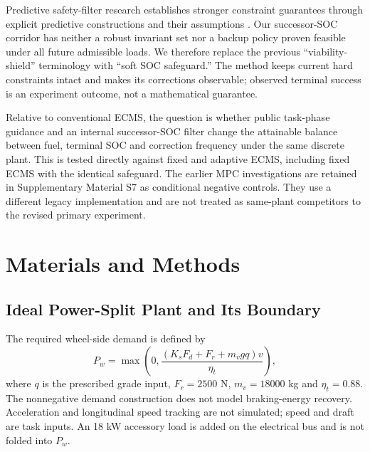\documentclass[energies,article,submit,moreauthors]{Definitions/mdpi}
\begin{document}
Predictive safety-filter research establishes stronger constraint guarantees through explicit predictive constructions and their assumptions \cite{wabersich2021}. Our successor-SOC corridor has neither a robust invariant set nor a backup policy proven feasible under all future admissible loads. We therefore replace the previous ``viability-shield'' terminology with ``soft SOC safeguard.'' The method keeps current hard constraints intact and makes its corrections observable; observed terminal success is an experiment outcome, not a mathematical guarantee.

Relative to conventional ECMS, the question is whether public task-phase guidance and an internal successor-SOC filter change the attainable balance between fuel, terminal SOC and correction frequency under the same discrete plant. This is tested directly against fixed and adaptive ECMS, including fixed ECMS with the identical safeguard. The earlier MPC investigations are retained in Supplementary Material S7 as conditional negative controls. They use a different legacy implementation and are not treated as same-plant competitors to the revised primary experiment.

\section{Materials and Methods}
\subsection{Ideal Power-Split Plant and Its Boundary}
The required wheel-side demand is defined by
\begin{equation}\label{eq:demand}
 P_w=\max\!\left(0,\frac{(K_sF_d+F_r+m_vgq)v}{\eta_t}\right),
\end{equation}
where $q$ is the prescribed grade input, $F_r=2500$ N, $m_v=18000$ kg and $\eta_t=0.88$. The nonnegative demand construction does not model braking-energy recovery. Acceleration and longitudinal speed tracking are not simulated; speed and draft are task inputs. An 18 kW accessory load is added on the electrical bus and is not folded into $P_w$.
\end{document}
